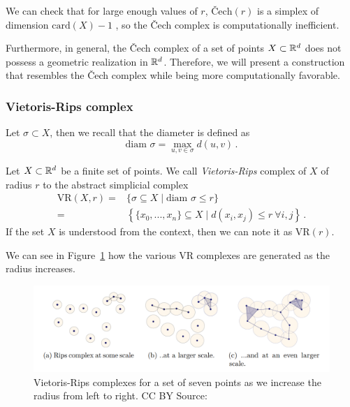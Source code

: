 \documentclass[../main.tex]{subfiles}
\begin{document}
We can check that for large enough values of $r$, $\text{\v{C}ech}(r)$ is a simplex of dimension $\text{card}(X)-1$ {\cite[Chapter~3]{edelsbrunner_computational_2010}}, so the \v{C}ech complex is computationally inefficient.

Furthermore, in general, the \v{C}ech complex of a set of points ${X \subset \mathbb{R}^d}$ does not possess a geometric realization in $\mathbb{R}^d$. Therefore, we will present a construction that resembles the \v{C}ech complex while being more computationally favorable.

\subsubsection*{Vietoris-Rips complex}

Let $\sigma \subset X$, then we recall that the diameter is defined as
\[\textrm{diam } \sigma = \max_{u,v \in \sigma} d(u,v)\,.\]

\begin{definition}
Let $X \subset \mathbb{R}^d$ be a finite set of points. We call \emph{Vietoris-Rips} complex of $X$ of radius $r$ to the abstract simplicial complex 
\begin{align*}
\text{VR}(X, r) =& \{\sigma \subseteq  X \mid \textrm{diam } \sigma \leq r\}\\
=&\left\{ \{x_0, ..., x_n\} \subseteq  X \mid d(x_i, x_j) \leq r\ \forall i,j\right\}\,. 
\end{align*}
If the set $X$ is understood from the context, then we can note it as $\text{VR}(r)$.
\end{definition}

We can see in Figure~\ref{fig:vr} how the various VR complexes are generated as the radius increases.

\begin{figure}[!ht]
\centering
\includegraphics[width=\textwidth]{figures/bg/vr.png} 
\caption{Vietoris-Rips complexes for a set of seven points as we increase the radius from left to right. CC BY Source: \cite{choudhary_approximation_2017}}
\label{fig:vr}
\end{figure}
\end{document}
